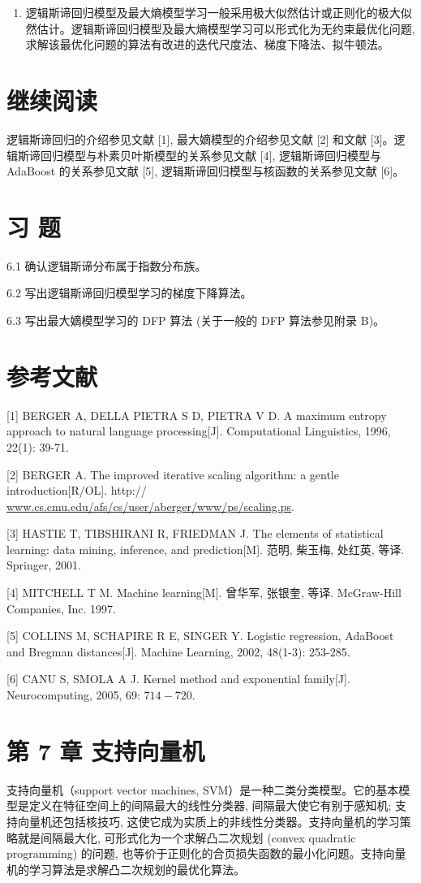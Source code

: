 \documentclass[10pt]{article}
\begin{document}
\begin{CJK*}{UTF8}{bsmi}
\begin{enumerate}
  \item 逻辑斯谛回归模型及最大熵模型学习一般采用极大似然估计或正则化的极大似然估计。逻辑斯谛回归模型及最大熵模型学习可以形式化为无约束最优化问题, 求解该最优化问题的算法有改进的迭代尺度法、梯度下降法、拟牛顿法。

\end{enumerate}

\section*{继续阅读}
逻辑斯谛回归的介绍参见文献 [1], 最大嫡模型的介绍参见文献 [2] 和文献 [3]。逻辑斯谛回归模型与朴素贝叶斯模型的关系参见文献 [4], 逻辑斯谛回归模型与 AdaBoost 的关系参见文献 [5], 逻辑斯谛回归模型与核函数的关系参见文献 [6]。

\section*{习 题}
6.1 确认逻辑斯谛分布属于指数分布族。

6.2 写出逻辑斯谛回归模型学习的梯度下降算法。

6.3 写出最大嫡模型学习的 DFP 算法 (关于一般的 DFP 算法参见附录 B)。

\section*{参考文献}
[1] BERGER A, DELLA PIETRA S D, PIETRA V D. A maximum entropy approach to natural language processing[J]. Computational Linguistics, 1996, 22(1): 39-71.

[2] BERGER A. The improved iterative scaling algorithm: a gentle introduction[R/OL]. http:// \href{http://www.cs.cmu.edu/afs/cs/user/aberger/www/ps/scaling.ps}{www.cs.cmu.edu/afs/cs/user/aberger/www/ps/scaling.ps}.

[3] HASTIE T, TIBSHIRANI R, FRIEDMAN J. The elements of statistical learning: data mining, inference, and prediction[M]. 范明, 柴玉梅, 处红英, 等译. Springer, 2001.

[4] MITCHELL T M. Machine learning[M]. 曾华军, 张银奎, 等译. McGraw-Hill Companies, Inc. 1997.

[5] COLLINS M, SCHAPIRE R E, SINGER Y. Logistic regression, AdaBoost and Bregman distances[J]. Machine Learning, 2002, 48(1-3): 253-285.

[6] CANU S, SMOLA A J. Kernel method and exponential family[J]. Neurocomputing, 2005, 69: $714-720$.

\section*{第 7 章 支持向量机}
支持向量机（support vector machines, SVM）是一种二类分类模型。它的基本模型是定义在特征空间上的间隔最大的线性分类器, 间隔最大使它有别于感知机; 支持向量机还包括核技巧, 这使它成为实质上的非线性分类器。支持向量机的学习策略就是间隔最大化, 可形式化为一个求解凸二次规划 (convex quadratic programming) 的问题, 也等价于正则化的合页损失函数的最小化问题。支持向量机的学习算法是求解凸二次规划的最优化算法。


\end{CJK*}
\end{document}
